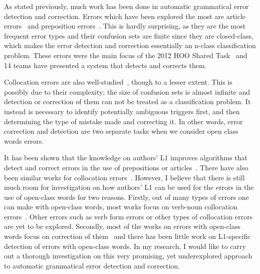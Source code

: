\documentclass[11pt]{article}
\begin{document}
As stated previously, much work has been done in automatic grammatical error detection and correction. Errors which have been explored the most are article errors~\citep{han2006detecting, rozovskaya2010training, turner2007language, dahlmeier2011grammatical, de2008classifier} and preposition errors~\citep{bergsma2009web, tetreault2008ups, tetreault2010using, dahlmeier2011grammatical, de2008classifier, chodorow2007detection}. This is hardly surprising, as they are the most frequent error types and their confusion sets are finite since they are closed-class, which makes the error detection and correction essentially an n-class classification problem. These errors were the main focus of the 2012 HOO Shared Task~\citep{dale2012hoo} and 14 teams have presented a system that detects and corrects them.

Collocation errors are also well-studied~\citep{shei2000esl, wible2003bootstrapping, futagi2008computational, liu2009automated}, though to a lesser extent. This is possibly due to their complexity; the size of confusion sets is almost infinite and detection or correction of them can not be treated as a classification problem. It instead is necessary to identify potentially ambiguous triggers first, and then determining the type of mistake made and correcting it. In other words, error correction and detection are two separate tasks when we consider open class words errors.

It has been shown that the knowledge on authors' L1 improves algorithms that detect and correct errors in the use of prepositions or articles~\citep{rozovskaya2010generating, rozovskaya2011algorithm}. There have also been similar works for collocation errors~\citep{chang2008automatic, dahlmeier2011correcting, shei2000esl, liu2009automated}. However, I believe that there is still much room for investigation on how authors' L1 can be used for the errors in the use of open-class words for two reasons. Firstly, out of many types of errors one can make with open-class words, most works focus on verb-noun collocation errors~\citep{chang2008automatic, shei2000esl, liu2009automated}. Other errors such as verb form errors or other types of collocation errors are yet to be explored. Secondly, most of the works on errors with open-class words focus on correction of them~\citep{dahlmeier2011correcting, chang2008automatic} and there has been little work on L1-specific detection of errors with open-class words.  In my research, I would like to carry out a thorough investigation on this very promising, yet underexplored approach to automatic grammatical error detection and correction.
\end{document}
